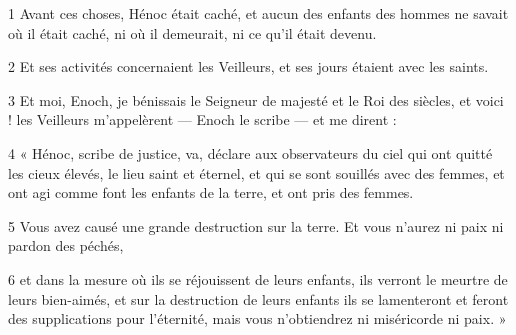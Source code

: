 
\par 1 Avant ces choses, Hénoc était caché, et aucun des enfants des hommes ne savait où il était caché, ni où il demeurait, ni ce qu'il était devenu.
\par 2 Et ses activités concernaient les Veilleurs, et ses jours étaient avec les saints.
\par 3 Et moi, Enoch, je bénissais le Seigneur de majesté et le Roi des siècles, et voici ! les Veilleurs m'appelèrent — Enoch le scribe — et me dirent :
\par 4 « Hénoc, scribe de justice, va, déclare aux observateurs du ciel qui ont quitté les cieux élevés, le lieu saint et éternel, et qui se sont souillés avec des femmes, et ont agi comme font les enfants de la terre, et ont pris des femmes.
\par 5 Vous avez causé une grande destruction sur la terre. Et vous n'aurez ni paix ni pardon des péchés,
\par 6 et dans la mesure où ils se réjouissent de leurs enfants, ils verront le meurtre de leurs bien-aimés, et sur la destruction de leurs enfants ils se lamenteront et feront des supplications pour l'éternité, mais vous n'obtiendrez ni miséricorde ni paix. »


